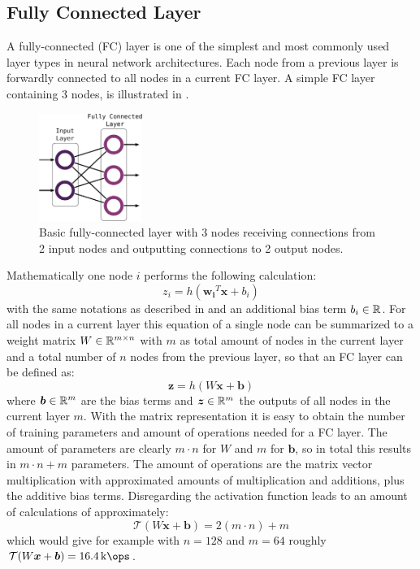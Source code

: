 
\subsection{Fully Connected Layer}
A fully-connected (FC) layer is one of the simplest and most commonly used layer types in neural network architectures.
Each node from a previous layer is forwardly connected to all nodes in a current FC layer.
A simple FC layer containing 3 nodes, is illustrated in .
\begin{figure}[!ht]
  \centering
    \includegraphics[width=0.30\textwidth]{./4_nn/figs/nn_theory_fc.pdf}
  \caption{Basic fully-connected layer with 3 nodes receiving connections from 2 input nodes and outputting connections to 2 output nodes.}
  \label{fig:nn_theory_fc}
\end{figure}
\FloatBarrier
\noindent
Mathematically one node $i$ performs the following calculation:
\begin{equation}
  z_i = h(\bm{w_i}^T \bm{x} + b_i)
\end{equation}
with the same notations as described in  and an additional bias term $b_i \in \mathbb{R}$.
For all nodes in a current layer this equation of a single node can be summarized to a weight matrix $W \in \mathbb{R}^{m \times n}$ with $m$ as total amount of nodes in the current layer and a total number of $n$ nodes from the previous layer, so that an FC layer can be defined as:
\begin{equation}
  \bm{z} = h(W \bm{x} + \bm{b})
\end{equation}
where $\bm{b} \in \mathbb{R}^m$ are the bias terms and $\bm{z} \in \mathbb{R}^m$ the outputs of all nodes in the current layer $m$.
With the matrix representation it is easy to obtain the number of training parameters and amount of operations needed for a FC layer.
The amount of parameters are clearly $m \cdot n$ for $W$ and $m$ for $\bm{b}$, so in total this results in $m \cdot n + m$ parameters.
The amount of operations are the matrix vector multiplication with approximated amounts of multiplication and additions, plus the additive bias terms.
Disregarding the activation function leads to an amount of calculations of approximately:
\begin{equation} 
  \mathcal{T}(W \bm{x} + \bm{b}) = 2 (m \cdot n) + m
\end{equation}
which would give for example with $n = 128$ and $m = 64$ roughly $\mathcal{T}(W \bm{x} + \bm{b}) = \SI{16.4}{\kilo\ops}$.


